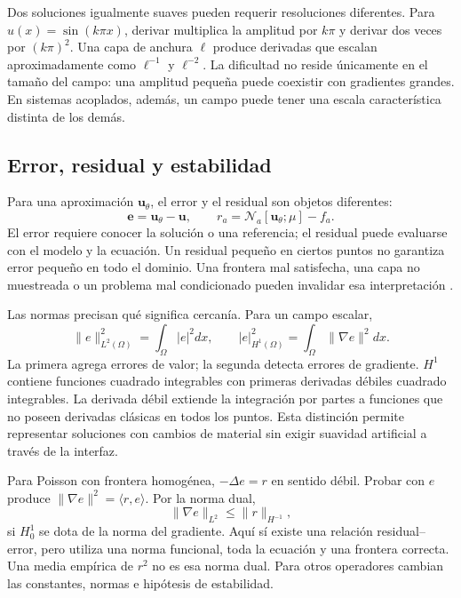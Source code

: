 Dos soluciones igualmente suaves pueden requerir resoluciones diferentes. Para $u(x)=\sin(k\pi x)$, derivar multiplica la amplitud por $k\pi$ y derivar dos veces por $(k\pi)^2$. Una capa de anchura $\ell$ produce derivadas que escalan aproximadamente como $\ell^{-1}$ y $\ell^{-2}$. La dificultad no reside únicamente en el tamaño del campo: una amplitud pequeña puede coexistir con gradientes grandes. En sistemas acoplados, además, un campo puede tener una escala característica distinta de los demás.

\subsection{Error, residual y estabilidad}
Para una aproximación $\mathbf u_\theta$, el error y el residual son objetos diferentes:
\begin{equation}
\mathbf e=\mathbf u_\theta-\mathbf u,\qquad
r_a=\mathcal N_a[\mathbf u_\theta;\mu]-f_a.
\label{eq:error-residual}
\end{equation}
El error requiere conocer la solución o una referencia; el residual puede evaluarse con el modelo y la ecuación. Un residual pequeño en ciertos puntos no garantiza error pequeño en todo el dominio. Una frontera mal satisfecha, una capa no muestreada o un problema mal condicionado pueden invalidar esa interpretación \cite{deryckmishra2022,grossmann2024}.

Las normas precisan qué significa cercanía. Para un campo escalar,
\begin{equation}
\|e\|_{L^2(\Omega)}^2=\int_\Omega |e|^2dx,\qquad
|e|_{H^1(\Omega)}^2=\int_\Omega\|\nabla e\|^2dx.
\end{equation}
La primera agrega errores de valor; la segunda detecta errores de gradiente. $H^1$ contiene funciones cuadrado integrables con primeras derivadas débiles cuadrado integrables. La derivada débil extiende la integración por partes a funciones que no poseen derivadas clásicas en todos los puntos. Esta distinción permite representar soluciones con cambios de material sin exigir suavidad artificial a través de la interfaz.

Para Poisson con frontera homogénea, $-\Delta e=r$ en sentido débil. Probar con $e$ produce $\|\nabla e\|^2=\langle r,e\rangle$. Por la norma dual,
\begin{equation}
\|\nabla e\|_{L^2}\leq\|r\|_{H^{-1}},
\end{equation}
si $H_0^1$ se dota de la norma del gradiente. Aquí sí existe una relación residual--error, pero utiliza una norma funcional, toda la ecuación y una frontera correcta. Una media empírica de $r^2$ no es esa norma dual. Para otros operadores cambian las constantes, normas e hipótesis de estabilidad.

